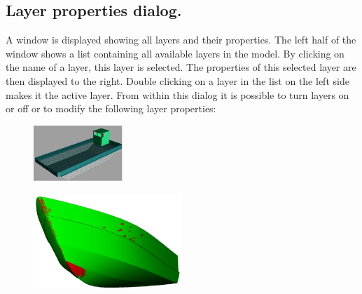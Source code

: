 \documentclass[12pt]{article}
\begin{document}
\subsection{Layer properties dialog.} \label{layer-properties}
A window is displayed showing all layers and their properties. The
left half of the window shows a list containing all available layers
in the model.  By clicking on the name of a layer, this layer is
selected. The properties of this selected layer are then displayed to
the right. Double clicking on a layer in the list on the left side
makes it the active layer. From within this dialog it is possible to
turn layers on or off or to modify the following layer properties:

\begin{figure}
        \centering
        \includegraphics[width=0.3\textwidth,natwidth=413,natheight=258]{layertransparent.png}
        \caption{}
        \label{fig:layertransparent}
\end{figure}

\begin{figure}
        \centering
        \includegraphics[width=0.5\textwidth,natwidth=666,natheight=422]{developable.png}
        \caption{}
        \label{fig:developable}
\end{figure}
\end{document}
